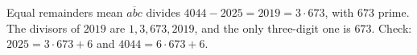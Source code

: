 Equal remainders mean $\overline{abc}$ divides $4044-2025=2019=3\cdot673$, with $673$ prime. The divisors of $2019$ are $1,3,673,2019$, and the only three-digit one is $\boxed{673}$. Check: $2025=3\cdot673+6$ and $4044=6\cdot673+6$.
